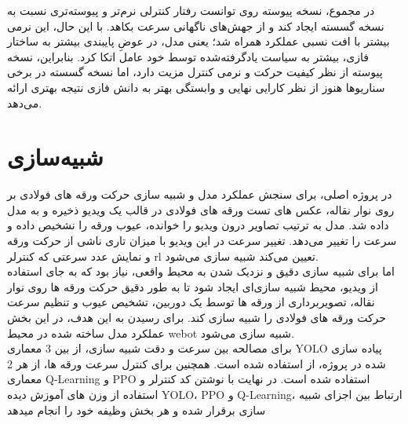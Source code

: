\documentclass[a4paper, 10pt, twocolumn]{article}
\begin{document}
	در مجموع، نسخه پیوسته  روی  توانست
	رفتار کنترلی نرم‌تر و پیوسته‌تری نسبت به نسخه گسسته ایجاد کند و از
	جهش‌های ناگهانی سرعت بکاهد. با این حال، این نرمی بیشتر با افت نسبی
	عملکرد همراه شد؛ یعنی مدل، در عوضِ پایبندی بیشتر به ساختار فازی،
	بیشتر به سیاست یادگرفته‌شده توسط خود عامل اتکا کرد. بنابراین، نسخه
	پیوسته از نظر کیفیت حرکت و نرمی کنترل مزیت دارد، اما نسخه گسسته در
	برخی سناریوها هنوز از نظر کارایی نهایی و وابستگی بهتر به دانش فازی
	نتیجه بهتری ارائه می‌دهد.
	
	
	
	\section{شبیه‌سازی}
	در پروژه اصلی، برای سنجش عملکرد مدل و شبیه سازی حرکت ورقه های فولادی بر روی نوار نقاله، عکس های تست ورقه های فولادی در قالب یک ویدیو ذخیره و به مدل داده شد. مدل به ترتیب تصاویر درون ویدیو را خوانده، عیوب ورقه را نشخیص داده و سرعت را تغییر می‌دهد. تغییر سرعت در این ویدیو با میزان تاری ناشی از حرکت ورقه و نمایش عدد سرعتی که کنترلر rl تعیین می‌کند شبیه سازی می‌شود.\\
	
	اما برای شبیه سازی دقیق و نزدیک شدن به محیط واقعی، نیاز بود که به جای استفاده از ویدیو، محیط شبیه سازی‌ای ایجاد شود تا به طور دقیق حرکت ورقه ها روی نوار نقاله، تصویربرداری از ورقه ها توسط یک دوربین، تشخیص عیوب  و تنظیم سرعت حرکت ورقه های فولادی را شبیه سازی کند. برای رسیدن به این هدف، در این بخش عملکرد مدل ساخته شده در محیط webot شبیه سازی می‌شود.\\
	
	برای مصالحه بین سرعت و دقت شبیه سازی، از بین 3 معماری YOLO پیاده سازی شده در پروژه، از استفاده شده است. همچنین برای کنترل سرعت ورقه ها، از هر 2 معماری Q-Learning و PPO استفاده شده است. در نهایت با نوشتن کد کنترلر و استفاده از وزن های آموزش دیده YOLO، PPO و Q-Learning، ارتباط بین اجزای شبیه سازی برقرار شده و هر بخش وظیفه خود را انجام میدهد
\end{document}
